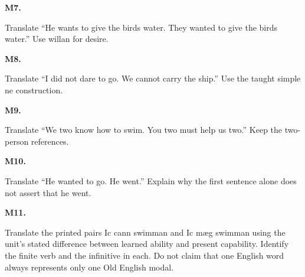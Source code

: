 \par\begin{minipage}{\linewidth}\raggedright
\textbf{M7.}

Translate “He wants to give the birds water. They wanted to give the birds water.” Use willan for desire.

\end{minipage}\par\addvspace{4pt}

\par\begin{minipage}{\linewidth}\raggedright
\textbf{M8.}

Translate “I did not dare to go. We cannot carry the ship.” Use the taught simple ne construction.

\end{minipage}\par\addvspace{4pt}

\par\begin{minipage}{\linewidth}\raggedright
\textbf{M9.}

Translate “We two know how to swim. You two must help us two.” Keep the two-person references.

\end{minipage}\par\addvspace{4pt}

\par\begin{minipage}{\linewidth}\raggedright
\textbf{M10.}

Translate “He wanted to go. He went.” Explain why the first sentence alone does not assert that he went.

\end{minipage}\par\addvspace{4pt}

\par\begin{minipage}{\linewidth}\raggedright
\textbf{M11.}

Translate the printed pairs Ic cann swimman and Ic mæg swimman using the unit’s stated difference between learned ability and present capability. Identify the finite verb and the infinitive in each. Do not claim that one English word always represents only one Old English modal.

\end{minipage}\par\addvspace{4pt}

